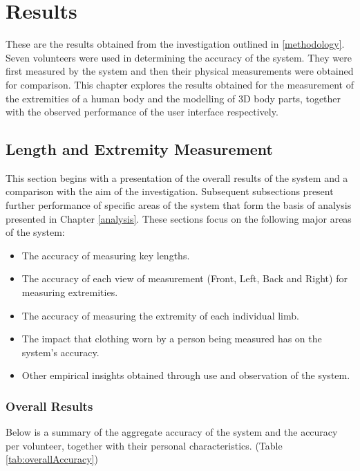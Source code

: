 \chapter{Results}
These are the results obtained from the investigation outlined in \ref{methodology}. Seven volunteers were used in determining the accuracy of the system. They were first measured by the system and then their physical measurements were obtained for comparison. This chapter explores the results obtained for the measurement of the extremities of a human body and the modelling of 3D body parts, together with the observed performance of the user interface respectively.

\section{Length and Extremity Measurement}

This section begins with a presentation of the overall results of the system and a comparison with the aim of the investigation. Subsequent subsections present further performance of specific areas of the system that form the basis of analysis presented in Chapter \ref{analysis}. These sections focus on the following major areas of the system:

\begin{itemize}
	\item The accuracy of measuring key lengths.
	\item The accuracy of each view of measurement (Front, Left, Back and Right) for measuring extremities.
	\item The accuracy of measuring the extremity of each individual limb.
	\item The impact that clothing worn by a person being measured has on the system's accuracy.
	\item Other empirical insights obtained through use and observation of the system. 
\end{itemize}


\subsection{Overall Results}
Below is a summary of the aggregate accuracy of the system and the accuracy per volunteer, together with their personal characteristics. (Table \ref{tab:overallAccuracy})
 
